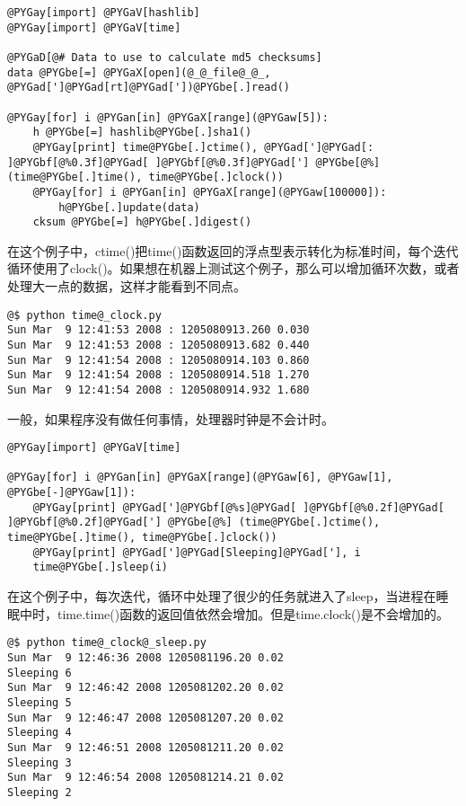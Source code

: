 \documentclass[a4paper,10pt,english]{manual}
\begin{document}
\begin{Verbatim}[commandchars=@\[\]]
@PYGay[import] @PYGaV[hashlib]
@PYGay[import] @PYGaV[time]

@PYGaD[@# Data to use to calculate md5 checksums]
data @PYGbe[=] @PYGaX[open](@_@_file@_@_, @PYGad[']@PYGad[rt]@PYGad['])@PYGbe[.]read()

@PYGay[for] i @PYGan[in] @PYGaX[range](@PYGaw[5]):
    h @PYGbe[=] hashlib@PYGbe[.]sha1()
    @PYGay[print] time@PYGbe[.]ctime(), @PYGad[']@PYGad[: ]@PYGbf[@%0.3f]@PYGad[ ]@PYGbf[@%0.3f]@PYGad['] @PYGbe[@%] (time@PYGbe[.]time(), time@PYGbe[.]clock())
    @PYGay[for] i @PYGan[in] @PYGaX[range](@PYGaw[100000]):
        h@PYGbe[.]update(data)
    cksum @PYGbe[=] h@PYGbe[.]digest()
\end{Verbatim}

在这个例子中，ctime()把time()函数返回的浮点型表示转化为标准时间，每个迭代循环使用了clock()。如果想在机器上测试这个例子，那么可以增加循环次数，或者处理大一点的数据，这样才能看到不同点。

\begin{Verbatim}[commandchars=@\[\]]
@$ python time@_clock.py
Sun Mar  9 12:41:53 2008 : 1205080913.260 0.030
Sun Mar  9 12:41:53 2008 : 1205080913.682 0.440
Sun Mar  9 12:41:54 2008 : 1205080914.103 0.860
Sun Mar  9 12:41:54 2008 : 1205080914.518 1.270
Sun Mar  9 12:41:54 2008 : 1205080914.932 1.680
\end{Verbatim}

一般，如果程序没有做任何事情，处理器时钟是不会计时。

\begin{Verbatim}[commandchars=@\[\]]
@PYGay[import] @PYGaV[time]

@PYGay[for] i @PYGan[in] @PYGaX[range](@PYGaw[6], @PYGaw[1], @PYGbe[-]@PYGaw[1]):
    @PYGay[print] @PYGad[']@PYGbf[@%s]@PYGad[ ]@PYGbf[@%0.2f]@PYGad[ ]@PYGbf[@%0.2f]@PYGad['] @PYGbe[@%] (time@PYGbe[.]ctime(), time@PYGbe[.]time(), time@PYGbe[.]clock())
    @PYGay[print] @PYGad[']@PYGad[Sleeping]@PYGad['], i
    time@PYGbe[.]sleep(i)
\end{Verbatim}

在这个例子中，每次迭代，循环中处理了很少的任务就进入了sleep，当进程在睡眠中时，time.time()函数的返回值依然会增加。但是time.clock()是不会增加的。

\begin{Verbatim}[commandchars=@\[\]]
@$ python time@_clock@_sleep.py
Sun Mar  9 12:46:36 2008 1205081196.20 0.02
Sleeping 6
Sun Mar  9 12:46:42 2008 1205081202.20 0.02
Sleeping 5
Sun Mar  9 12:46:47 2008 1205081207.20 0.02
Sleeping 4
Sun Mar  9 12:46:51 2008 1205081211.20 0.02
Sleeping 3
Sun Mar  9 12:46:54 2008 1205081214.21 0.02
Sleeping 2
\end{Verbatim}
\end{document}
